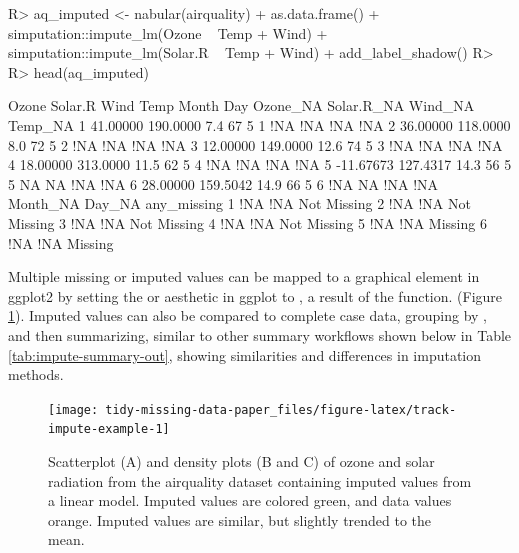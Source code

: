 \documentclass[
]{jss}
\begin{document}
\begin{CodeChunk}
\begin{CodeInput}
R> aq_imputed <- nabular(airquality) %
+   as.data.frame() %
+   simputation::impute_lm(Ozone ~ Temp + Wind) %
+   simputation::impute_lm(Solar.R ~ Temp + Wind) %
+   add_label_shadow()
R> 
R> head(aq_imputed)
\end{CodeInput}
\begin{CodeOutput}
      Ozone  Solar.R Wind Temp Month Day Ozone_NA Solar.R_NA Wind_NA Temp_NA
1  41.00000 190.0000  7.4   67     5   1      !NA        !NA     !NA     !NA
2  36.00000 118.0000  8.0   72     5   2      !NA        !NA     !NA     !NA
3  12.00000 149.0000 12.6   74     5   3      !NA        !NA     !NA     !NA
4  18.00000 313.0000 11.5   62     5   4      !NA        !NA     !NA     !NA
5 -11.67673 127.4317 14.3   56     5   5       NA         NA     !NA     !NA
6  28.00000 159.5042 14.9   66     5   6      !NA         NA     !NA     !NA
  Month_NA Day_NA any_missing
1      !NA    !NA Not Missing
2      !NA    !NA Not Missing
3      !NA    !NA Not Missing
4      !NA    !NA Not Missing
5      !NA    !NA     Missing
6      !NA    !NA     Missing
\end{CodeOutput}
\end{CodeChunk}

Multiple missing or imputed values can be mapped to a graphical element in ggplot2 by setting the  or  aesthetic in ggplot to , a result of the  function. (Figure \ref{fig:track-impute-example}). Imputed values can also be compared to complete case data, grouping by , and then summarizing, similar to other  summary workflows shown below in Table \ref{tab:impute-summary-out}, showing similarities and differences in imputation methods.

\begin{CodeChunk}
\begin{figure}

{\centering \texttt{[image: tidy-missing-data-paper\_files/figure-latex/track-impute-example-1]} 

}

\caption[Scatterplot (A) and density plots (B and C) of ozone and solar radiation from the airquality dataset containing imputed values from a linear model]{Scatterplot (A) and density plots (B and C) of ozone and solar radiation from the airquality dataset containing imputed values from a linear model. Imputed values are colored green, and data values orange. Imputed values are similar, but slightly trended to the mean.}\label{fig:track-impute-example}
\end{figure}
\end{CodeChunk}
\end{document}

